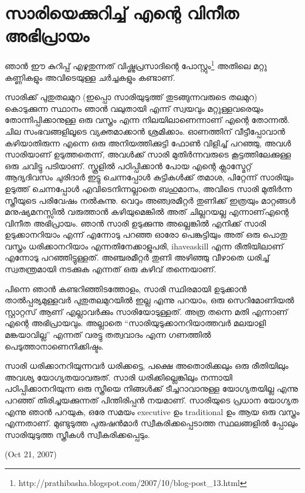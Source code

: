 \section*{സാരിയെക്കുറിച്ച് എന്റെ വിനീത അഭിപ്രായം}
\vskip 2pt


ഞാന്‍ ഈ കുറിപ്പ് എഴുതുന്നത് വിഷ്ണുപ്രസാദിന്റെ പോസ്റ്റും\footnote{http://prathibasha.blogspot.com/2007/10/blog-post_13.html} അതിലെ മറ്റു കണ്ണികളും അവിടെയുള്ള ചര്‍ച്ചകളും കണ്ടാണ്.

സാരിക്ക് പുതുതലമുറ (ഇപ്പൊ സാരിയുടുത്ത് തുടങ്ങുന്നവരുടെ തലമുറ) കൊടുക്കുന്ന സ്ഥാനം ഞാന്‍ വലുതായി എന്ന് സ്വയവും മറ്റുള്ളവരെയും തോന്നിപ്പിക്കാനുള്ള ഒരു വസ്ത്രം എന്ന നിലയിലാണെന്നാണ് എന്റെ തോന്നല്‍. ചില സംഭവങ്ങളിലൂടെ വ്യക്തമാക്കാന്‍ ശ്രമിക്കാം. ഓണത്തിന് വീട്ടീപ്പോവാന്‍ കഴിയാതിരുന്ന എന്നെ ഒരു അനിയത്തിക്കുട്ടി ഫോണ്‍ വിളിച്ച് പറഞ്ഞു, അവള്‍ സാരിയാണ് ഉടുത്തതെന്ന്, അവള്‍ക്ക് സാരി മുതിര്‍ന്നവരുടെ കൂട്ടത്തിലേക്കുള്ള ഒരു ചവിട്ടു പടിയാണ്. സ്കൂളില്‍ പഠിപ്പിക്കാന്‍ പോയ എന്റെ ക്ലാസ്മേറ്റ് ആദ്യദിവസം ചുരിദാര്‍ ഇട്ടു ചെന്നപ്പോള്‍ കുട്ടികള്‍ക്ക് തമാശ, പിറ്റേന്ന് സാരിയും ഉടുത്ത് ചെന്നപ്പോള്‍ എവിടെനിന്നല്ലാതെ ബഹുമാനം, അവിടെ സാരി മുതിര്‍ന്ന സ്ത്രീയുടെ പരിവേഷം നല്‍കുന്നു. വെറും അഞ്വരമീറ്റര്‍ തുണിക്ക് ഇത്രയും മാറ്റങ്ങള്‍ മനുഷ്യമനസ്സില്‍ വരുത്താന്‍ കഴിയുമെങ്കില്‍ അത് ചില്ലറയല്ല എന്നാണ്എന്റെ വിനീത അഭിപ്രായം. ഞാന്‍ സാരി ഉടുക്കുന്നു അല്ലെങ്കില്‍ എനിക്ക് സാരി ഉടുക്കാനറിയാം എന്ന് എന്നോടു പറഞ്ഞ ഓരോ പെങ്കുട്ടിയും അത് ഒരു പൊതു വസ്ത്രം ധരിക്കാനറിയാം എന്നതിനേക്കാളുപരി, ihaveaskill എന്ന രീതിയിലാണ് എന്നോടു പറഞ്ഞിട്ടുള്ളത്. അഞ്ചരമീറ്റര്‍ തുണി അഴിഞ്ഞു വീഴാതെ ധരിച്ച് സ്വതന്ത്രമായി നടക്കുക എന്നത് ഒരു കഴിവ് തന്നെയാണ്.

പിന്നെ ഞാന്‍ കണ്ടറിഞ്ഞിടത്തോളം, സാരി സ്ഥിരമായി ഉടുക്കാന്‍ താല്‍പ്പര്യമുള്ളവര്‍ പുതുതലമുറയില്‍ ഇല്ല എന്നു പറയാം, ഒരു സെറിമോണിയല്‍ സ്റ്റാറ്റസ് ആണ് എല്ലാവര്‍ക്കും സാരിയോടുള്ളത്. അത്ര തന്നെ മതി എന്നാണ് എന്റെ അഭിപ്രായവും. അല്ലാതെ “സാരിയുടുക്കാനറിയാത്തവര്‍ മലയാളി മങ്കയാവില്ല” എന്നത് വരട്ടു തത്വവാദം എന്ന ഗണത്തില്‍ പെടുത്താനാണെനിക്കിഷ്ടം.

സാരി ധരിക്കാനറിയുന്നവര്‍ ധരിക്കട്ടെ, പക്ഷെ അതൊരിക്കലും ഒരു രീതിയിലും അവശ്യ യോഗ്യതയാവരുത്. സാരി ധരിക്കില്ലെങ്കിലും നന്നായി പഠിപ്പിക്കാനറിയുന്ന ഒരു സ്ത്രീയെ നിങ്ങള്‍ക്ക് ടീച്ചറാവാനുള്ള യോഗ്യതയില്ല എന്നു പറഞ്ഞ് തിരിച്ചയക്കുന്നത് പിന്തിരിപ്പന്‍ നയമാണ്. സാരിയുടെ പ്രധാന യോഗ്യത എന്നു ഞാന്‍ പറയുക, ഒരേ സമയം executive ഉം traditional ഉം ആയ ഒരു വസ്ത്രം എന്നതാണ്. മുണ്ടുടുത്ത പുരുഷന്‍മാര്‍ സ്വീകരിക്കപ്പെടാത്ത സ്ഥലങ്ങളില്‍ പ്പോലും സാരിയുടുത്ത സ്ത്രീകള്‍ സ്വീകരിക്കപ്പെടും.

(Oct 21, 2007)
\newpage
